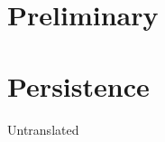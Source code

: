 \documentclass[11pt,oneside,a4paper, openany]{book}
\begin{document}
\setcounter{tocdepth}{1}

\begingroup
\let\cleardoublepage\clearpage
\tableofcontents
\endgroup

\mainmatter
{}

%

\part{Preliminary} \label{part:prelim}
%





\part{Persistence} \label{part:persist}

Untranslated
%

%
%

%
%

%
%

%

%
%
%

%



\end{document}
